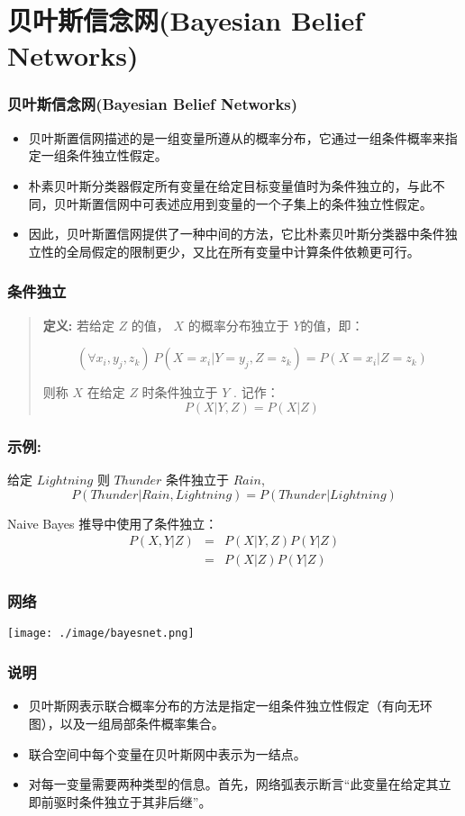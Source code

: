 \documentclass{beamer}
\begin{document}
\section{贝叶斯信念网(Bayesian Belief Networks)}
\label{sec-10}
\begin{frame}
\frametitle{贝叶斯信念网(Bayesian Belief Networks)}
\label{sec-10-1}


\begin{itemize}
\item 贝叶斯置信网描述的是一组变量所遵从的概率分布，它通过一组条件概率来指定一组条件独立性假定。
\item 朴素贝叶斯分类器假定所有变量在给定目标变量值时为条件独立的，与此不同，贝叶斯置信网中可表述应用到变量的一个子集上的条件独立性假定。
\item 因此，贝叶斯置信网提供了一种中间的方法，它比朴素贝叶斯分类器中条件独立性的全局假定的限制更少，又比在所有变量中计算条件依赖更可行。
\end{itemize}
\end{frame}
\begin{frame}
\frametitle{条件独立}
\label{sec-10-2}


\begin{quote}
{\bf 定义:} 若给定 $Z$ 的值， $X$ 的概率分布独立于 $Y$的值，即：

$$(\forall x_i,y_j,z_k) \ P(X = x_i | Y = y_j, Z = z_k) =   P(X = x_i | Z = z_k)$$

则称 $X$ 在给定 $Z$ 时条件独立于 $Y$ . 记作：
$$P(X | Y,Z) = P(X | Z)$$
\end{quote}
\end{frame}
\begin{frame}
\frametitle{示例:}
\label{sec-10-3}

给定 $Lightning$ 则 $Thunder$ 条件独立于 $Rain$, 
$$P(Thunder | Rain, Lightning) = P(Thunder | Lightning)$$

Naive Bayes 推导中使用了条件独立：
\begin{eqnarray}
P(X,Y|Z) &= &P(X|Y,Z) P(Y|Z)  \nonumber \\
 &= &P(X|Z) P(Y|Z)  \nonumber
\end{eqnarray}
\end{frame}
\begin{frame}
\frametitle{网络}
\label{sec-10-4}


\texttt{[image: ./image/bayesnet.png]}
\end{frame}
\begin{frame}
\frametitle{说明}
\label{sec-10-5}


\begin{itemize}
\item 贝叶斯网表示联合概率分布的方法是指定一组条件独立性假定（有向无环图），以及一组局部条件概率集合。
\item 联合空间中每个变量在贝叶斯网中表示为一结点。
\item 对每一变量需要两种类型的信息。首先，网络弧表示断言“此变量在给定其立即前驱时条件独立于其非后继”。
\end{itemize}
\end{frame}
\end{document}
